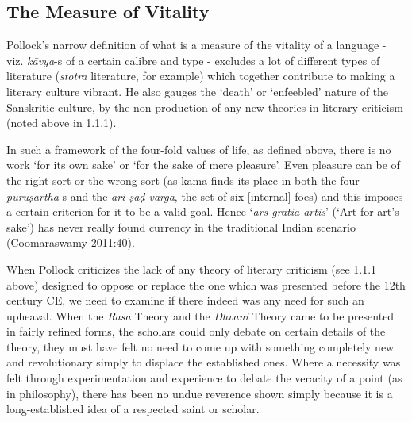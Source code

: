 \subsection{The Measure of Vitality}
\vskip -5pt

Pollock’s narrow definition of what is a measure of the vitality of a language - viz. {\sl kāvya}-s of a certain calibre and type - excludes a lot of different types of literature ({\sl stotra} literature, for example) which together contribute to making a literary culture vibrant. He also gauges the ‘death’ or ‘enfeebled’ nature of the Sanskritic culture,  by the non-production of any new theories in literary criticism (noted above in 1.1.1).

In such a framework of the four-fold values of life, as defined above, there is no work ‘for its own sake’ or ‘for the sake of mere pleasure’. Even pleasure can be of the right sort or the wrong sort (as kāma finds its place in both the four {\sl puruṣārtha}-s and the {\sl ari-ṣaḍ-varga}, the set of six [internal] foes) and this imposes a certain criterion for it to be a valid goal. Hence ‘{\sl ars gratia artis}’ (‘Art for art’s sake’) has never really found currency in the traditional Indian scenario (Coomaraswamy 2011:40). 

When Pollock criticizes the lack of any theory of literary criticism (see 1.1.1 above) designed to oppose or replace the one which was presented before the 12th century CE, we need to examine if there indeed was any need for such an upheaval. When the {\sl Rasa} Theory and the {\sl Dhvani} Theory came to be presented in fairly refined forms, the scholars could only debate on certain details of the theory, they must have felt no need to come up with something completely new and revolutionary simply to displace the established ones. Where a necessity was felt through experimentation and experience to debate the veracity of a point (as in philosophy), there has been no undue reverence shown simply because it is a long-established idea of a respected saint or scholar.

